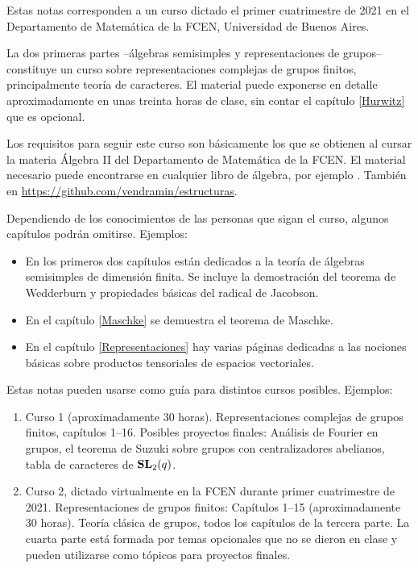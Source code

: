 \preface

Estas notas corresponden a un curso dictado el primer cuatrimestre de 2021 en 
el Departamento de Matemática de la FCEN, Universidad de Buenos Aires. 

La dos primeras partes --álgebras semisimples y representaciones de grupos-- 
constituye un curso sobre representaciones complejas 
de grupos finitos, principalmente teoría de caracteres. El material 
puede exponerse en detalle aproximadamente en unas treinta horas 
de clase, sin contar el capítulo \ref{Hurwitz}  
que es opcional. 

Los requisitos para seguir este curso son básicamente los
que se obtienen al cursar la materia Álgebra II del 
Departamento de Matemática de la FCEN. El material 
necesario puede encontrarse en cualquier libro de álgebra, 
por ejemplo \cite{MR600654}.
También en \url{https://github.com/vendramin/estructuras}.

Dependiendo
de los conocimientos de las personas que sigan el curso, 
algunos capítulos podrán omitirse. Ejemplos: 

\begin{itemize}
    \item En los primeros dos capítulos están dedicados a la teoría de álgebras semisimples de dimensión finita. Se incluye la demostración del teorema de Wedderburn y propiedades básicas del radical de Jacobson. 
    \item En el capítulo \ref{Maschke} se demuestra el teorema de Maschke. 
    \item En el capítulo \ref{Representaciones} hay varias páginas dedicadas a las nociones básicas sobre
    productos tensoriales de espacios vectoriales. 
\end{itemize}

Estas notas pueden usarse como guía para distintos cursos posibles. 
Ejemplos:  
\begin{enumerate}
    \item Curso 1 (aproximadamente 30 horas). 
    Representaciones complejas de grupos finitos, capítulos 1--16. 
    Posibles proyectos finales: Análisis de Fourier en grupos, 
    el teorema de Suzuki sobre grupos con centralizadores abelianos, tabla de caracteres de
    $\mathbf{SL}_2(q)$. 
    \item Curso 2, dictado virtualmente en la FCEN durante primer cuatrimestre de 2021. 
    Representaciones de grupos finitos: Capítulos 1--15 (aproximadamente 30 horas). 
    Teoría clásica de grupos, todos los capítulos de la tercera parte. La cuarta parte
    está formada por temas opcionales que no se dieron en clase y pueden utilizarse como
    tópicos para proyectos finales. 
\end{enumerate}

